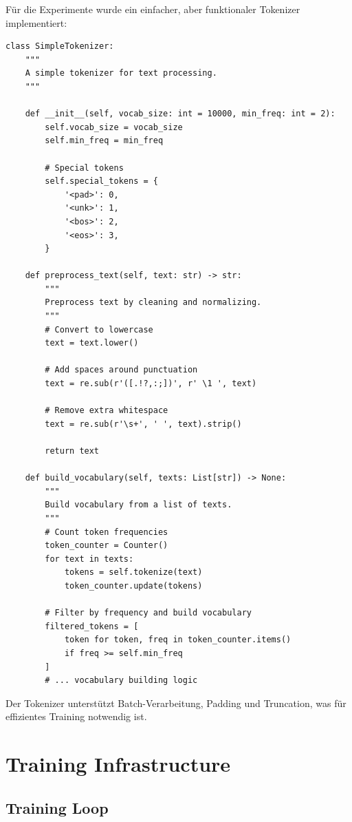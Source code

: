 Für die Experimente wurde ein einfacher, aber funktionaler Tokenizer implementiert:

\begin{lstlisting}[style=pythonstyle, caption=Tokenizer Grundfunktionen]
class SimpleTokenizer:
    """
    A simple tokenizer for text processing.
    """
    
    def __init__(self, vocab_size: int = 10000, min_freq: int = 2):
        self.vocab_size = vocab_size
        self.min_freq = min_freq
        
        # Special tokens
        self.special_tokens = {
            '<pad>': 0,
            '<unk>': 1,
            '<bos>': 2,
            '<eos>': 3,
        }
    
    def preprocess_text(self, text: str) -> str:
        """
        Preprocess text by cleaning and normalizing.
        """
        # Convert to lowercase
        text = text.lower()
        
        # Add spaces around punctuation
        text = re.sub(r'([.!?,:;])', r' \1 ', text)
        
        # Remove extra whitespace
        text = re.sub(r'\s+', ' ', text).strip()
        
        return text
    
    def build_vocabulary(self, texts: List[str]) -> None:
        """
        Build vocabulary from a list of texts.
        """
        # Count token frequencies
        token_counter = Counter()
        for text in texts:
            tokens = self.tokenize(text)
            token_counter.update(tokens)
        
        # Filter by frequency and build vocabulary
        filtered_tokens = [
            token for token, freq in token_counter.items() 
            if freq >= self.min_freq
        ]
        # ... vocabulary building logic
\end{lstlisting}

Der Tokenizer unterstützt Batch-Verarbeitung, Padding und Truncation, was für effizientes Training notwendig ist.

\section{Training Infrastructure}

\subsection{Training Loop}

